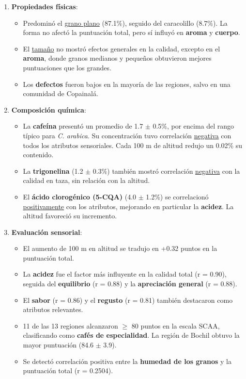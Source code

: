 \documentclass{article}
\begin{document}
\begin{enumerate}
	\item \textbf{Propiedades físicas}:
	\begin{itemize}
		\item Predominó el \underline{grano plano} (87.1\%), seguido del caracolillo (8.7\%). La forma no afectó la puntuación total, pero sí influyó en \textbf{aroma} y \textbf{cuerpo}.
		\item El \underline{tamaño} no mostró efectos generales en la calidad, excepto en el \textbf{aroma}, donde granos medianos y pequeños obtuvieron mejores puntuaciones que los grandes.
		\item Los \textbf{defectos} fueron bajos en la mayoría de las regiones, salvo en una comunidad de Copainalá.
	\end{itemize}
	
	\item \textbf{Composición química}:
	\begin{itemize}
		\item La \textbf{cafeína} presentó un promedio de 1.7 $\pm$ 0.5\%, por encima del rango típico para \textit{C. arabica}. Su concentración tuvo correlación \underline{negativa} con todos los atributos sensoriales. Cada 100 m de altitud redujo un 0.02\% su contenido.
		\item La \textbf{trigonelina} (1.2 $\pm$ 0.3\%) también mostró correlación \underline{negativa} con la calidad en taza, sin relación con la altitud.
		\item El \textbf{ácido clorogénico (5-CQA)} (4.0 $\pm$ 1.2\%) se correlacionó \underline{positivamente} con los atributos, mejorando en particular la \textbf{acidez}. La altitud favoreció su incremento.
	\end{itemize}
	
	\item \textbf{Evaluación sensorial}:
	\begin{itemize}
		\item El aumento de 100 m en altitud se tradujo en +0.32 puntos en la puntuación total.
		\item La \textbf{acidez} fue el factor más influyente en la calidad total (r = 0.90), seguida del \textbf{equilibrio} (r = 0.88) y la \textbf{apreciación general} (r = 0.88).
		\item El \textbf{sabor} (r = 0.86) y el \textbf{regusto} (r = 0.81) también destacaron como atributos relevantes.
		\item 11 de las 13 regiones alcanzaron $\geq$ 80 puntos en la escala SCAA, clasificando como \textbf{cafés de especialidad}. La región de Bochil obtuvo la mayor puntuación (84.6 $\pm$ 3.9).
		\item Se detectó correlación positiva entre la \textbf{humedad de los granos} y la puntuación total (r = 0.2504).
	\end{itemize}
\end{enumerate} \vspace{0.3cm}
\end{document}
